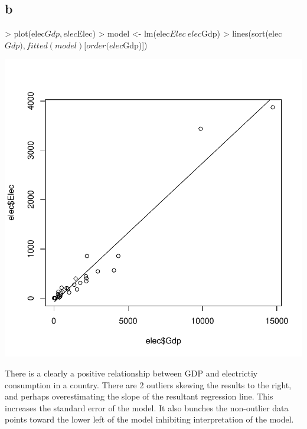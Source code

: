 \documentclass{article}
\begin{document}
\subsection*{b}
\begin{Schunk}
\begin{Sinput}
> plot(elec$Gdp, elec$Elec)
> model <- lm(elec$Elec ~ elec$Gdp)
> lines(sort(elec$Gdp), fitted(model)[order(elec$Gdp)])
\end{Sinput}
\end{Schunk}
\includegraphics{Assignment1b-002}

\noindent
There is a clearly a positive relationship between GDP and electrictiy consumption in a country. There are 2 outliers skewing the results to the right, and perhaps overestimating the slope of the resultant regression line. This increases the standard error of the model. It also bunches the non-outlier data points toward the lower left of the model inhibiting interpretation of the model. 
\end{document}
